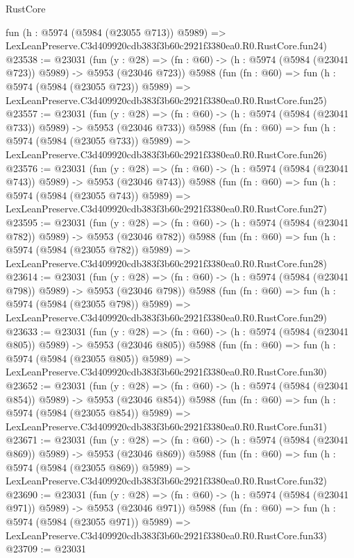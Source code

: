 \begin{lexlean}{RustCore}
\begin{coremodule}
    fun (h : @5974 (@5984 (@23055 @713)) @5989) =>
    LexLeanPreserve.C3d409920cdb383f3b60c2921f3380ea0.R0.RustCore.fun24)
@23538 := @23031
    (fun (y : @28) => (fn : @60) -> (h : @5974 (@5984 (@23041 @723)) @5989) -> @5953 (@23046 @723))
    @5988
    (fun (fn : @60) =>
    fun (h : @5974 (@5984 (@23055 @723)) @5989) =>
    LexLeanPreserve.C3d409920cdb383f3b60c2921f3380ea0.R0.RustCore.fun25)
@23557 := @23031
    (fun (y : @28) => (fn : @60) -> (h : @5974 (@5984 (@23041 @733)) @5989) -> @5953 (@23046 @733))
    @5988
    (fun (fn : @60) =>
    fun (h : @5974 (@5984 (@23055 @733)) @5989) =>
    LexLeanPreserve.C3d409920cdb383f3b60c2921f3380ea0.R0.RustCore.fun26)
@23576 := @23031
    (fun (y : @28) => (fn : @60) -> (h : @5974 (@5984 (@23041 @743)) @5989) -> @5953 (@23046 @743))
    @5988
    (fun (fn : @60) =>
    fun (h : @5974 (@5984 (@23055 @743)) @5989) =>
    LexLeanPreserve.C3d409920cdb383f3b60c2921f3380ea0.R0.RustCore.fun27)
@23595 := @23031
    (fun (y : @28) => (fn : @60) -> (h : @5974 (@5984 (@23041 @782)) @5989) -> @5953 (@23046 @782))
    @5988
    (fun (fn : @60) =>
    fun (h : @5974 (@5984 (@23055 @782)) @5989) =>
    LexLeanPreserve.C3d409920cdb383f3b60c2921f3380ea0.R0.RustCore.fun28)
@23614 := @23031
    (fun (y : @28) => (fn : @60) -> (h : @5974 (@5984 (@23041 @798)) @5989) -> @5953 (@23046 @798))
    @5988
    (fun (fn : @60) =>
    fun (h : @5974 (@5984 (@23055 @798)) @5989) =>
    LexLeanPreserve.C3d409920cdb383f3b60c2921f3380ea0.R0.RustCore.fun29)
@23633 := @23031
    (fun (y : @28) => (fn : @60) -> (h : @5974 (@5984 (@23041 @805)) @5989) -> @5953 (@23046 @805))
    @5988
    (fun (fn : @60) =>
    fun (h : @5974 (@5984 (@23055 @805)) @5989) =>
    LexLeanPreserve.C3d409920cdb383f3b60c2921f3380ea0.R0.RustCore.fun30)
@23652 := @23031
    (fun (y : @28) => (fn : @60) -> (h : @5974 (@5984 (@23041 @854)) @5989) -> @5953 (@23046 @854))
    @5988
    (fun (fn : @60) =>
    fun (h : @5974 (@5984 (@23055 @854)) @5989) =>
    LexLeanPreserve.C3d409920cdb383f3b60c2921f3380ea0.R0.RustCore.fun31)
@23671 := @23031
    (fun (y : @28) => (fn : @60) -> (h : @5974 (@5984 (@23041 @869)) @5989) -> @5953 (@23046 @869))
    @5988
    (fun (fn : @60) =>
    fun (h : @5974 (@5984 (@23055 @869)) @5989) =>
    LexLeanPreserve.C3d409920cdb383f3b60c2921f3380ea0.R0.RustCore.fun32)
@23690 := @23031
    (fun (y : @28) => (fn : @60) -> (h : @5974 (@5984 (@23041 @971)) @5989) -> @5953 (@23046 @971))
    @5988
    (fun (fn : @60) =>
    fun (h : @5974 (@5984 (@23055 @971)) @5989) =>
    LexLeanPreserve.C3d409920cdb383f3b60c2921f3380ea0.R0.RustCore.fun33)
@23709 := @23031

\end{coremodule}
\end{lexlean}
